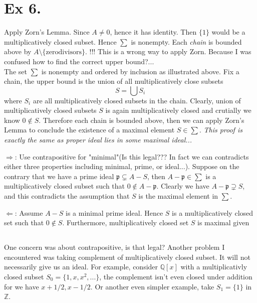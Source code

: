 \section{Ex 6.}\label{Atiyah Chap 3 Ex 6.}

Apply Zorn's Lemma. Since $A\neq 0$, hence it has identity. Then $\{1\}$ would be a multiplicatively closed subset. Hence $\sum$ is nonempty. Each \textit{chain} is bounded above by $A\setminus\{\text{zerodivisors}\}$. !!!
This is a wrong way to apply Zorn. Because I was confused how to find the correct upper bound?...\\

The set $\sum$ is nonempty and ordered by inclusion as illustrated above. Fix a chain, the upper bound is the union of all multiplicatively close subsets \[S=\bigcup S_i\] where $S_i$ are all multiplicatively closed subsets in the chain. Clearly, union of multiplicatively closed subsets $S$ is again multiplicatively closed and crutially we know $0\notin S$. Therefore each chain is bounded above, then we can apply Zorn's Lemma to conclude the existence of a maximal element $S\in \sum$. \textit{This proof is exactly the same as proper ideal lies in some maximal ideal...}

$\Rightarrow$: Use contrapositive for "minimal"(Is this legal??? In fact we can contradicts either three properties including minimal, prime, or ideal...). Suppose on the contrary that we have a prime ideal $\mathfrak p\subsetneq A-S$, then $A-\mathfrak p\in \sum$ is a multiplicatively closed subset such that $0\notin A-\mathfrak p$. Clearly we have $A-\mathfrak p\supsetneq S$, and this contradicts the assumption that $S$ is the maximal element in $\sum$.

$\Leftarrow$: Assume $A-S$ is a minimal prime ideal. Hence $S$ is a multiplicatively closed set such that $0\notin S$. Furthermore, multiplicatively closed set $S$ is maximal given

\subsection{}
One concern was about contrapositive, is that legal? Another problem I encountered was taking complement of multiplicatively closed subset. It will not necessarily give us an ideal. For example, consider $\mathbb Q[x]$ with a multiplicativly closed subset $S_0=\{1,x,x^2,...\}$, the complement isn't even closed under addition for we have $x+1/2,x-1/2$. Or another even simpler example, take $S_1=\{1\}$ in $\mathbb Z$.

